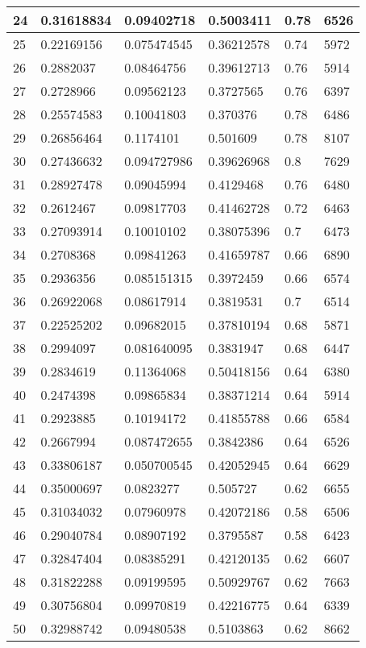 \begin{longtable}{|l|l|l|l|l|l|}
24 & 0.31618834 & 0.09402718 & 0.5003411 & 0.78 & 6526 \\ \hline 
25 & 0.22169156 & 0.075474545 & 0.36212578 & 0.74 & 5972 \\ \hline 
26 & 0.2882037 & 0.08464756 & 0.39612713 & 0.76 & 5914 \\ \hline 
27 & 0.2728966 & 0.09562123 & 0.3727565 & 0.76 & 6397 \\ \hline 
28 & 0.25574583 & 0.10041803 & 0.370376 & 0.78 & 6486 \\ \hline 
29 & 0.26856464 & 0.1174101 & 0.501609 & 0.78 & 8107 \\ \hline 
30 & 0.27436632 & 0.094727986 & 0.39626968 & 0.8 & 7629 \\ \hline 
31 & 0.28927478 & 0.09045994 & 0.4129468 & 0.76 & 6480 \\ \hline 
32 & 0.2612467 & 0.09817703 & 0.41462728 & 0.72 & 6463 \\ \hline 
33 & 0.27093914 & 0.10010102 & 0.38075396 & 0.7 & 6473 \\ \hline 
34 & 0.2708368 & 0.09841263 & 0.41659787 & 0.66 & 6890 \\ \hline 
35 & 0.2936356 & 0.085151315 & 0.3972459 & 0.66 & 6574 \\ \hline 
36 & 0.26922068 & 0.08617914 & 0.3819531 & 0.7 & 6514 \\ \hline 
37 & 0.22525202 & 0.09682015 & 0.37810194 & 0.68 & 5871 \\ \hline 
38 & 0.2994097 & 0.081640095 & 0.3831947 & 0.68 & 6447 \\ \hline 
39 & 0.2834619 & 0.11364068 & 0.50418156 & 0.64 & 6380 \\ \hline 
40 & 0.2474398 & 0.09865834 & 0.38371214 & 0.64 & 5914 \\ \hline 
41 & 0.2923885 & 0.10194172 & 0.41855788 & 0.66 & 6584 \\ \hline 
42 & 0.2667994 & 0.087472655 & 0.3842386 & 0.64 & 6526 \\ \hline 
43 & 0.33806187 & 0.050700545 & 0.42052945 & 0.64 & 6629 \\ \hline 
44 & 0.35000697 & 0.0823277 & 0.505727 & 0.62 & 6655 \\ \hline 
45 & 0.31034032 & 0.07960978 & 0.42072186 & 0.58 & 6506 \\ \hline 
46 & 0.29040784 & 0.08907192 & 0.3795587 & 0.58 & 6423 \\ \hline 
47 & 0.32847404 & 0.08385291 & 0.42120135 & 0.62 & 6607 \\ \hline 
48 & 0.31822288 & 0.09199595 & 0.50929767 & 0.62 & 7663 \\ \hline 
49 & 0.30756804 & 0.09970819 & 0.42216775 & 0.64 & 6339 \\ \hline 
50 & 0.32988742 & 0.09480538 & 0.5103863 & 0.62 & 8662 \\ \hline 
\end{longtable}